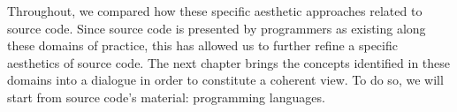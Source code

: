 Throughout, we compared how these specific aesthetic approaches related to source code. Since source code is presented by programmers as existing along these domains of practice, this has allowed us to further refine a specific aesthetics of source code. The next chapter brings the concepts identified in these domains into a dialogue in order to constitute a coherent view. To do so, we will start from source code's material: programming languages.
